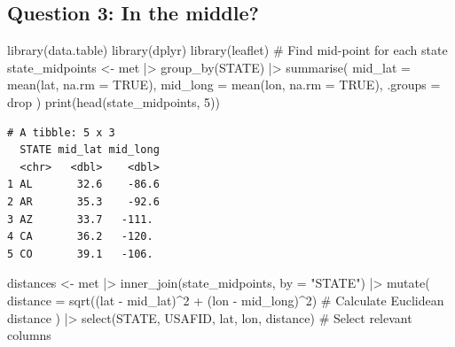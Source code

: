 \documentclass[
  letterpaper,
  DIV=11,
  numbers=noendperiod]{scrartcl}
\newenvironment{Shaded}{\begin{snugshade}}{\end{snugshade}}
\newcommand{\AttributeTok}[1]{\textcolor[rgb]{0.40,0.45,0.13}{#1}}
\newcommand{\CommentTok}[1]{\textcolor[rgb]{0.37,0.37,0.37}{#1}}
\newcommand{\ConstantTok}[1]{\textcolor[rgb]{0.56,0.35,0.01}{#1}}
\newcommand{\DecValTok}[1]{\textcolor[rgb]{0.68,0.00,0.00}{#1}}
\newcommand{\FunctionTok}[1]{\textcolor[rgb]{0.28,0.35,0.67}{#1}}
\newcommand{\NormalTok}[1]{\textcolor[rgb]{0.00,0.23,0.31}{#1}}
\newcommand{\OtherTok}[1]{\textcolor[rgb]{0.00,0.23,0.31}{#1}}
\newcommand{\SpecialCharTok}[1]{\textcolor[rgb]{0.37,0.37,0.37}{#1}}
\newcommand{\StringTok}[1]{\textcolor[rgb]{0.13,0.47,0.30}{#1}}
\begin{document}
\subsection{Question 3: In the middle?}\label{question-3-in-the-middle}

\begin{Shaded}
\begin{Highlighting}[]
\FunctionTok{library}\NormalTok{(data.table)}
\FunctionTok{library}\NormalTok{(dplyr)}
\FunctionTok{library}\NormalTok{(leaflet)}
\CommentTok{\# Find mid{-}point for each state}
\NormalTok{state\_midpoints }\OtherTok{\textless{}{-}}\NormalTok{ met }\SpecialCharTok{|\textgreater{}}
  \FunctionTok{group\_by}\NormalTok{(STATE) }\SpecialCharTok{|\textgreater{}}
  \FunctionTok{summarise}\NormalTok{(}
    \AttributeTok{mid\_lat =} \FunctionTok{mean}\NormalTok{(lat, }\AttributeTok{na.rm =} \ConstantTok{TRUE}\NormalTok{),}
    \AttributeTok{mid\_long =} \FunctionTok{mean}\NormalTok{(lon, }\AttributeTok{na.rm =} \ConstantTok{TRUE}\NormalTok{),}
    \AttributeTok{.groups =} \StringTok{\textquotesingle{}drop\textquotesingle{}}
\NormalTok{  )}
\FunctionTok{print}\NormalTok{(}\FunctionTok{head}\NormalTok{(state\_midpoints, }\DecValTok{5}\NormalTok{))}
\end{Highlighting}
\end{Shaded}

\begin{verbatim}
# A tibble: 5 x 3
  STATE mid_lat mid_long
  <chr>   <dbl>    <dbl>
1 AL       32.6    -86.6
2 AR       35.3    -92.6
3 AZ       33.7   -111. 
4 CA       36.2   -120. 
5 CO       39.1   -106. 
\end{verbatim}

\begin{Shaded}
\begin{Highlighting}[]
\NormalTok{distances }\OtherTok{\textless{}{-}}\NormalTok{ met }\SpecialCharTok{|\textgreater{}}
\FunctionTok{inner\_join}\NormalTok{(state\_midpoints, }\AttributeTok{by =} \StringTok{"STATE"}\NormalTok{) }\SpecialCharTok{|\textgreater{}}
\FunctionTok{mutate}\NormalTok{(}
\AttributeTok{distance =} \FunctionTok{sqrt}\NormalTok{((lat }\SpecialCharTok{{-}}\NormalTok{ mid\_lat)}\SpecialCharTok{\^{}}\DecValTok{2} \SpecialCharTok{+}\NormalTok{ (lon }\SpecialCharTok{{-}}\NormalTok{ mid\_long)}\SpecialCharTok{\^{}}\DecValTok{2}\NormalTok{)  }\CommentTok{\# Calculate Euclidean distance}
\NormalTok{  ) }\SpecialCharTok{|\textgreater{}}
  \FunctionTok{select}\NormalTok{(STATE, USAFID, lat, lon, distance)  }\CommentTok{\# Select relevant columns}
\end{Highlighting}
\end{Shaded}
\end{document}

